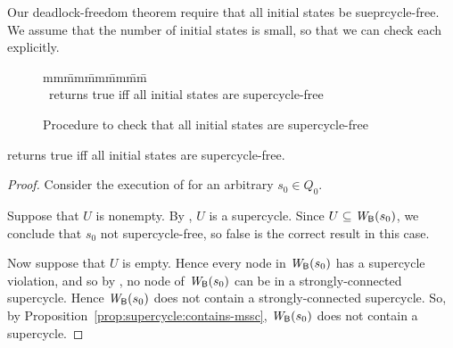 
Our deadlock-freedom theorem require that all initial states be sueprcycle-free. 
We assume that the number of initial states is small, so that we can check each explicitly. 


\begin{figure}[ht]
\setcounter{lctr}{0}
\begin{tabbing}\label{alg:compute-scViol}
mm\= mm\= mm\= mm\= mm\=\kill
{}\\
\cmnt\ returns true iff all initial states are supercycle-free\\
\lion{\ELSE\ \RETURNE{\ttt}}
\end{tabbing}
\label{fig:checkInitSCFree}
\caption{Procedure to check that all initial states are supercycle-free}
\end{figure}


\begin{proposition}
 returns true iff all initial states are supercycle-free.
\end{proposition}
%
\begin{proof}
Consider the execution of  for an arbitrary $s_0 \in Q_0$.

Suppose that $U$ is nonempty. 
By , $U$ is a supercycle. 
Since $U \subseteq \mathit{W}_{\mathsf{B}}({s_0})$, we conclude that $s_0$ not supercycle-free, so false is the correct
result in this case.

Now suppose that $U$ is empty. Hence every node in $\mathit{W}_{\mathsf{B}}({s_0})$ has a supercycle violation, and so
by , no node of $\mathit{W}_{\mathsf{B}}({s_0})$ can be in a 
strongly-connected supercycle. Hence  $\mathit{W}_{\mathsf{B}}({s_0})$ does not contain a strongly-connected supercycle.
So, by Proposition~\ref{prop:supercycle:contains-mssc}, $\mathit{W}_{\mathsf{B}}({s_0})$ does not contain a supercycle.
\end{proof}
